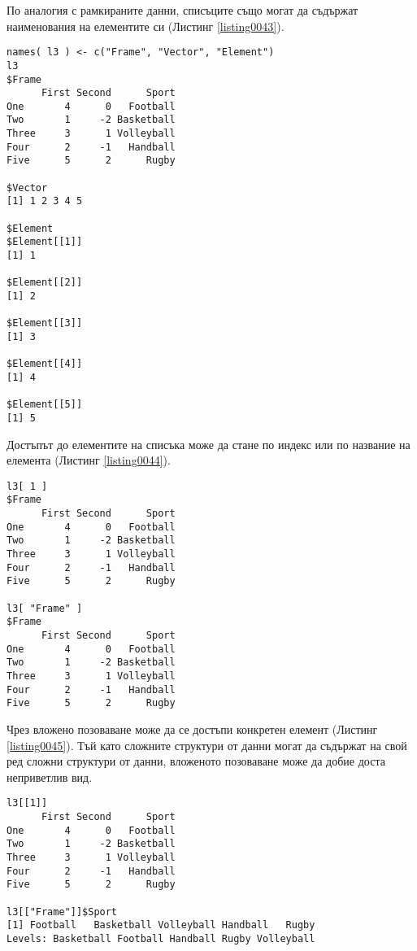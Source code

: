 По аналогия с рамкираните данни, списъците също могат да съдържат наименования на елементите си (Листинг \ref{listing0043}).

\begin{lstlisting}[caption=Названия на елементите в списъка, label=listing0043]
names( l3 ) <- c("Frame", "Vector", "Element")
l3
$Frame
      First Second      Sport
One       4      0   Football
Two       1     -2 Basketball
Three     3      1 Volleyball
Four      2     -1   Handball
Five      5      2      Rugby

$Vector
[1] 1 2 3 4 5

$Element
$Element[[1]]
[1] 1

$Element[[2]]
[1] 2

$Element[[3]]
[1] 3

$Element[[4]]
[1] 4

$Element[[5]]
[1] 5
\end{lstlisting}

Достъпът до елементите на списъка може да стане по индекс или по название на елемента (Листинг \ref{listing0044}).

\begin{lstlisting}[caption=Достъп до елементите на списъка, label=listing0044]
l3[ 1 ]
$Frame
      First Second      Sport
One       4      0   Football
Two       1     -2 Basketball
Three     3      1 Volleyball
Four      2     -1   Handball
Five      5      2      Rugby

l3[ "Frame" ]
$Frame
      First Second      Sport
One       4      0   Football
Two       1     -2 Basketball
Three     3      1 Volleyball
Four      2     -1   Handball
Five      5      2      Rugby
\end{lstlisting}

Чрез вложено позоваване може да се достъпи конкретен елемент (Листинг \ref{listing0045}). Тъй като сложните структури от данни могат да съдържат на свой ред сложни структури от данни, вложеното позоваване може да добие доста неприветлив вид. 

\begin{lstlisting}[caption=Вложено позоваване, label=listing0045]
l3[[1]]
      First Second      Sport
One       4      0   Football
Two       1     -2 Basketball
Three     3      1 Volleyball
Four      2     -1   Handball
Five      5      2      Rugby

l3[["Frame"]]$Sport
[1] Football   Basketball Volleyball Handball   Rugby     
Levels: Basketball Football Handball Rugby Volleyball
\end{lstlisting}

